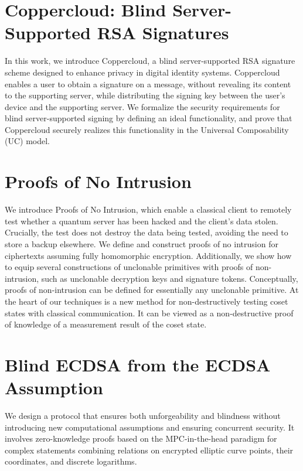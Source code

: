 \documentclass[11pt,oneside]{book}
\theoremstyle{definition}
\theoremstyle{remark}
\theoremstyle{plain}
\begin{document}
\section{\cite{cryptoeprint:2025/1824} Coppercloud: Blind Server-Supported RSA Signatures}
 In this work, we introduce Coppercloud, a blind server-supported RSA signature scheme designed to enhance privacy in digital identity systems. Coppercloud enables a user to obtain a signature on a message, without revealing its content to the supporting server, while distributing the signing key between the user's device and the supporting server. We formalize the security requirements for blind server-supported signing by defining an ideal functionality, and prove that Coppercloud securely realizes this functionality in the Universal Composability (UC) model.
 
 \section{\cite{cryptoeprint:2025/1826} Proofs of No Intrusion}
 We introduce Proofs of No Intrusion, which enable a classical client to remotely test whether a quantum server has been hacked and the client's data stolen. Crucially, the test does not destroy the data being tested, avoiding the need to store a backup elsewhere. We define and construct proofs of no intrusion for ciphertexts assuming fully homomorphic encryption. Additionally, we show how to equip several constructions of unclonable primitives with proofs of non-intrusion, such as unclonable decryption keys and signature tokens. Conceptually, proofs of non-intrusion can be defined for essentially any unclonable primitive. At the heart of our techniques is a new method for non-destructively testing coset states with classical communication. It can be viewed as a non-destructive proof of knowledge of a measurement result of the coset state.
 
 \section{\cite{cryptoeprint:2025/1827} Blind ECDSA from the ECDSA Assumption}
 We design a protocol that ensures both unforgeability and blindness without introducing new computational assumptions and ensuring concurrent security. It involves zero-knowledge proofs based on the MPC-in-the-head paradigm for complex statements combining relations on encrypted elliptic curve points, their coordinates, and discrete logarithms.
 
\end{document}
